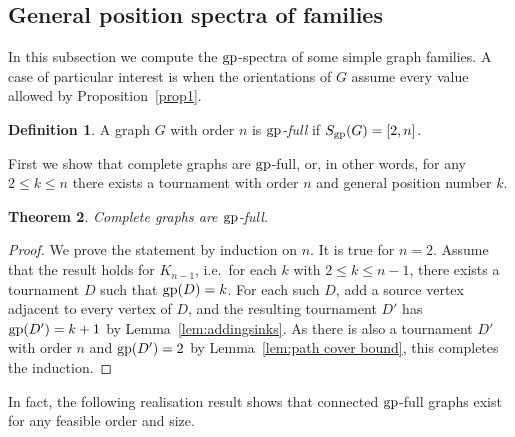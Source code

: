 \documentclass[a4paper,12pt]{article}
\newtheorem{theorem}{Theorem}[section]
\theoremstyle{definition}
\newtheorem{definition}[theorem]{Definition}
\newcommand{\gp}{{\rm gp}}
\begin{document}
	
	
	\subsection{General position spectra of families}
	
	In this subsection we compute the $\gp $-spectra of some simple graph families. A case of particular interest is when the orientations of $G$ assume every value allowed by Proposition~\ref{prop1}.
	
	\begin{definition}
		A graph $G$ with order $n$ is \emph{$\gp $-full} if $S_{\gp}(G) = [2,n]$.
	\end{definition}
	
	First we show that complete graphs are $\gp $-full, or, in other words, for any $2 \leq k \leq n$ there exists a tournament with order $n$ and general position number $k$.
	
	\begin{theorem}
		Complete graphs are $\gp $-full.
	\end{theorem}
	\begin{proof}
		We prove the statement by induction on $n$. It is true for $n = 2$.  Assume that the result holds for $K_{n-1}$, i.e.\ for each $k$ with $2 \leq k \leq n-1$, there exists a tournament $D$ such that $\gp(D) = k$.  For each such $D$, add a source vertex adjacent to every vertex of $D$, and the resulting tournament $D'$ has $\gp (D') = k+1$ by Lemma~\ref{lem:addingsinks}. As there is also a tournament $D'$ with order $n$ and $\gp (D') = 2$ by Lemma~\ref{lem:path cover bound}, this completes the induction. 
	\end{proof}
	
	In fact, the following realisation result shows that connected $\gp $-full graphs exist for any feasible order and size.
	
\end{document}
